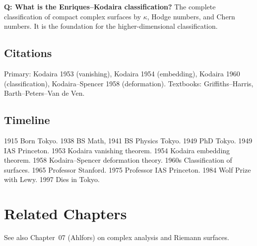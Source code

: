\noindent\textbf{Q: What is the Enriques--Kodaira classification?} The complete classification of compact complex surfaces by $\kappa$, Hodge numbers, and Chern numbers. It is the foundation for the higher-dimensional classification.

\subsection*{Citations}

Primary: Kodaira 1953 (vanishing), Kodaira 1954 (embedding), Kodaira 1960 (classification), Kodaira--Spencer 1958 (deformation). Textbooks: Griffiths--Harris, Barth--Peters--Van de Ven.

\subsection*{Timeline}

1915 Born Tokyo. 1938 BS Math, 1941 BS Physics Tokyo. 1949 PhD Tokyo. 1949 IAS Princeton. 1953 Kodaira vanishing theorem. 1954 Kodaira embedding theorem. 1958 Kodaira--Spencer deformation theory. 1960s Classification of surfaces. 1965 Professor Stanford. 1975 Professor IAS Princeton. 1984 Wolf Prize with Lewy. 1997 Dies in Tokyo.

\section{Related Chapters}
See also Chapter~07 (Ahlfors) on complex analysis and Riemann surfaces.

